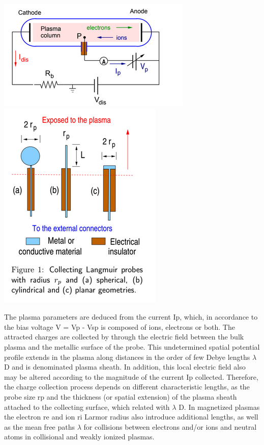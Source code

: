 \documentclass[]{report}[12 pt]
\begin{document}
\begin{center}
	\includegraphics{lp1.png}\\
	\includegraphics[width=6 cm]{lp2.png}
\end{center}
The plasma parameters are deduced from the current Ip, which, in accordance to the bias voltage V = Vp - Vsp is composed of ions, electrons or both. The attracted charges are collected by through the electric field between the bulk plasma and the metallic surface of the probe. This undetermined spatial potential profile extends in the plasma along distances in the order of few Debye lengths $\lambda$ D and is denominated plasma sheath. In
addition, this local electric field also may be altered according to the magnitude of the current Ip collected.
Therefore, the charge collection process depends on different characteristic lengths, as the probe size rp and the thickness (or spatial extension) of the plasma sheath attached to the collecting surface, which related with $\lambda$ D. In magnetized plasmas the electron re and ion ri Larmor radius also introduce additional lengths, as well as the mean free paths $\lambda$ for collisions between electrons and/or ions and neutral atoms
in collisional and weakly ionized plasmas.
\end{document}
